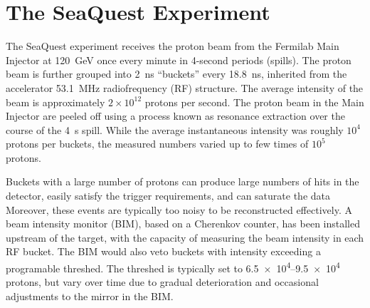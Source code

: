 \documentclass[reprint,aps,unsortedaddress,superscriptaddress,prc,floatfix,showpacs,linenumbers]{revtex4-2}
\begin{document}
\section{The SeaQuest Experiment}
\label{sec:seaquest_spectrometer}
The SeaQuest experiment receives the  proton beam from the Fermilab Main Injector at \SI{120}{\GeV}
once every minute in 4-second periods (spills).
The proton beam is further grouped into \SI{2}{\ns} ``buckets'' every \SI{18.8}{\ns},
inherited from the accelerator \SI{53.1}{\MHz} radiofrequency (RF) structure.
The average intensity of the beam is approximately $2\times 10^{12}$ protons per second.
The proton beam in the Main Injector are peeled off using a process known as resonance
extraction over the course of the \SI{4}{\second} spill.
While the average instantaneous intensity was roughly $10^4$ protons per buckets,
the measured numbers varied up to few times of $10^5$ protons.

Buckets with a large number of protons can produce large numbers of hits in the detector,
easily satisfy the trigger requirements, and can saturate the data
Moreover, these events are typically too noisy to be reconstructed effectively.
A beam intensity monitor (BIM), based on a Cherenkov counter,
has been installed upstream of the target, with the capacity of measuring the beam intensity in each RF bucket.
The BIM would also veto buckets with intensity exceeding a programable threshed.
The threshed is typically set to \numrange{6.5e4}{9.5e4} protons,
but vary over time due to gradual deterioration and occasional adjustments to the mirror in the BIM.
\end{document}
